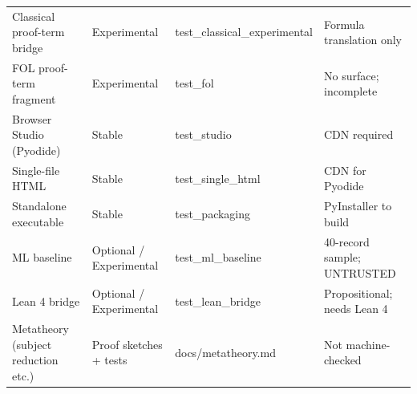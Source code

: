 \documentclass[11pt,a4paper]{article}
\theoremstyle{definition}
\theoremstyle{plain}
\begin{document}
\begin{table}[H]
\begin{tabular}{@{}p{4.5cm}lp{3.5cm}p{3cm}@{}}
Classical proof-term bridge & Experimental &
  test\_classical\_experimental & Formula translation only \\
FOL proof-term fragment & Experimental &
  test\_fol & No surface; incomplete \\
Browser Studio (Pyodide) & Stable &
  test\_studio & CDN required \\
Single-file HTML & Stable &
  test\_single\_html & CDN for Pyodide \\
Standalone executable & Stable &
  test\_packaging & PyInstaller to build \\
ML baseline & Optional / Experimental &
  test\_ml\_baseline & 40-record sample; UNTRUSTED \\
Lean 4 bridge & Optional / Experimental &
  test\_lean\_bridge & Propositional; needs Lean 4 \\
Metatheory (subject reduction etc.) & Proof sketches + tests &
  docs/metatheory.md & Not machine-checked \\
\bottomrule
\end{tabular}
\end{table}



\end{document}
